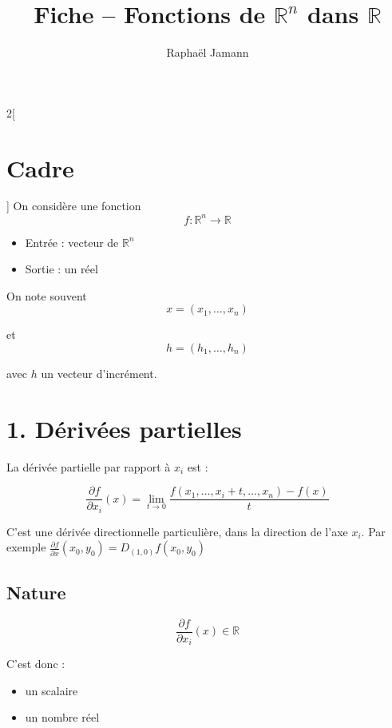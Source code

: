\documentclass[a4paper,12pt]{article}
\title{Fiche -- Fonctions de $\mathbb{R}^n$ dans $\mathbb{R}$}
\author{Raphaël Jamann}
\date{}
\begin{document}
    \maketitle
    
    \begin{multicols}{2}[
    \section*{Cadre}
    ]
        On considère une fonction
        $$
        f : \mathbb{R}^n \to \mathbb{R}
        $$

        \begin{itemize}
            \item Entrée : vecteur de $\mathbb{R}^n$
            \item Sortie : un réel
        \end{itemize}

        On note souvent
        $$
        x=(x_1,\dots,x_n)
        $$

        et
        $$
        h=(h_1,\dots,h_n)
        $$

        avec $h$ un vecteur d'incrément.

    \section*{1. Dérivées partielles}

        La dérivée partielle par rapport à $x_i$ est :

        $$
        \frac{\partial f}{\partial x_i}(x)
        =
        \lim_{t\to 0}
        \frac{f(x_1,\dots,x_i+t,\dots,x_n)-f(x)}{t}
        $$

        C'est une dérivée directionnelle particulière, dans la direction de l'axe $x_i$. 
        Par exemple $ \frac{\partial f}{\partial x}(x_0, y_0) = D_{(1,0)}f(x_0, y_0) $

        \subsection*{Nature}

        $$
        \frac{\partial f}{\partial x_i}(x)\in\mathbb{R}
        $$

        C'est donc :
        \begin{itemize}
            \item un scalaire
            \item un nombre réel
        \end{itemize}


\end{multicols}
\end{document}

